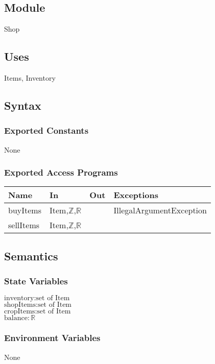 \documentclass[12pt, titlepage]{article}
\begin{document}
\subsection{Module}
Shop

\subsection{Uses}
Items, Inventory 


\subsection{Syntax}

\subsubsection{Exported Constants}
None

\subsubsection{Exported Access Programs}

\begin{center}
\begin{tabular}{p{4cm} p{3cm} p{2cm} p{3cm}}
\hline
\textbf{Name} & \textbf{In} & \textbf{Out} & \textbf{Exceptions} \\
\hline
buyItems & Item,$\mathbb{Z}$,$\mathbb{R}$  &  & IllegalArgumentException \\
\hline
sellItems &  Item,$\mathbb{Z}$,$\mathbb{R}$ &  & \\
\hline
\end{tabular}
\end{center}

\subsection{Semantics}

\subsubsection{State Variables}
$\text{inventory}: \text{set of Item}$\\
$\text{shopItems}: \text{set of Item}$\\
$\text{cropItems}: \text{set of Item}$\\
$\text{balance}: \mathbb{R}$\\
\subsubsection{Environment Variables}
None
\end{document}
